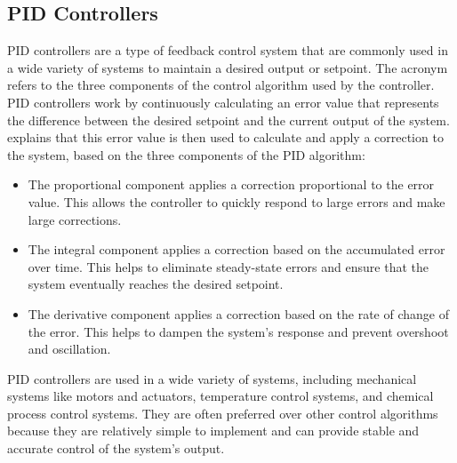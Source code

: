 \subsection{\acs{PID} Controllers}
\ac{PID} controllers are a type of feedback control system that are commonly used in a wide variety of systems to maintain a desired output or setpoint. The acronym refers to the three components of the control algorithm used by the controller. \ac{PID} controllers work by continuously calculating an error value that represents the difference between the desired setpoint and the current output of the system. \citeauthor{Rames_2012} \cite{Rames_2012} explains that this error value is then used to calculate and apply a correction to the system, based on the three components of the \ac{PID} algorithm:
\begin{itemize}
    \item The proportional component applies a correction proportional to the error value. This allows the controller to quickly respond to large errors and make large corrections.
    \item The integral component applies a correction based on the accumulated error over time. This helps to eliminate steady-state errors and ensure that the system eventually reaches the desired setpoint.
    \item The derivative component applies a correction based on the rate of change of the error. This helps to dampen the system's response and prevent overshoot and oscillation.  
\end{itemize}


\ac{PID} controllers are used in a wide variety of systems, including mechanical systems like motors and actuators, temperature control systems, and chemical process control systems. They are often preferred over other control algorithms because they are relatively simple to implement and can provide stable and accurate control of the system's output.

